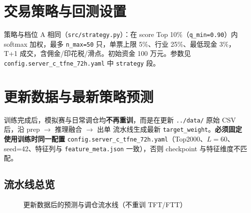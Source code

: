 \documentclass[UTF8,a4paper,12pt]{ctexart}
\begin{document}
\section{交易策略与回测设置}

策略与档位 A 相同（\texttt{src/strategy.py}）：在 score Top 10\%（\texttt{q\_min=0.90}）内 softmax 加权，最多 \texttt{n\_max=50} 只，单票上限 5\%、行业 25\%、最低现金 3\%，T+1 成交，含佣金/印花税/滑点。初始资金 100 万元。参数见 \texttt{config.server\_c\_tfne\_72h.yaml} 中 \texttt{strategy} 段。

\section{更新数据与最新策略预测}
\label{sec:predict-update}

训练完成后，模拟赛与日常调仓均\textbf{不再重训}，而是在更新 \texttt{../data/} 原始 CSV 后，沿 prep $\to$ 推理融合 $\to$ 出单 流水线生成最新 \texttt{target\_weight}。\textbf{必须固定使用训练时同一配置} \texttt{config.server\_c\_tfne\_72h.yaml}（Top2000、$L=60$、seed=42、特征列与 \texttt{feature\_meta.json} 一致），否则 checkpoint 与特征维度不匹配。

\subsection{流水线总览}

\begin{figure}[H]
\centering
{}
\caption{更新数据后的预测与调仓流水线（不重训 TFT/FTT）}
\label{fig:predict-pipe}
\end{figure}
\end{document}
